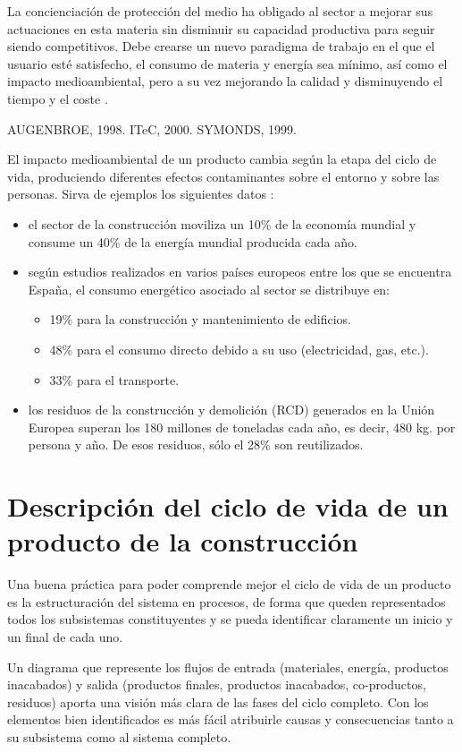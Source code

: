 La concienciación de protección del medio ha obligado al sector a mejorar sus actuaciones en esta materia sin disminuir su capacidad productiva para seguir siendo competitivos. Debe crearse un nuevo paradigma de trabajo en el que el usuario esté satisfecho, el consumo de materia y energía sea mínimo, así como el impacto medioambiental, pero a su vez mejorando la calidad y disminuyendo el tiempo y el coste \cite{carvalho}.

AUGENBROE, 1998.
ITeC, 2000.
SYMONDS, 1999.

El impacto medioambiental de un producto cambia según la etapa del ciclo de vida, produciendo diferentes efectos contaminantes sobre el entorno y sobre las personas. Sirva de ejemplos los siguientes datos \cite{carvalho}:
\begin{itemize}
\item el sector de la construcción moviliza un 10\% de la economía mundial y consume un 40\% de la energía mundial producida cada año.
\item según estudios realizados en varios países europeos entre los que se encuentra España, el consumo energético asociado al sector se distribuye en:
  \begin{itemize}
  \item 19\% para la construcción y mantenimiento de edificios.
  \item 48\% para el consumo directo debido a su uso (electricidad, gas, etc.).
  \item 33\% para el transporte.
  \end{itemize}
\item los residuos de la construcción y demolición (RCD) generados en la Unión Europea superan los 180 millones de toneladas cada año, es decir, 480 kg. por persona y año. De esos residuos, sólo el 28\% son reutilizados.
\end{itemize}

\section{Descripción del ciclo de vida de un producto de la construcción}
Una buena práctica para poder comprende mejor el ciclo de vida de un producto es la estructuración del sistema en procesos, de forma que queden representados todos los subsistemas constituyentes y se pueda identificar claramente un inicio y un final de cada uno.

Un diagrama que represente los flujos de entrada (materiales, energía, productos inacabados) y salida (productos finales, productos inacabados, co-productos, residuos) aporta una visión más clara de las fases del ciclo completo. Con los elementos bien identificados es más fácil atribuirle causas y consecuencias tanto a su subsistema como al sistema completo.

